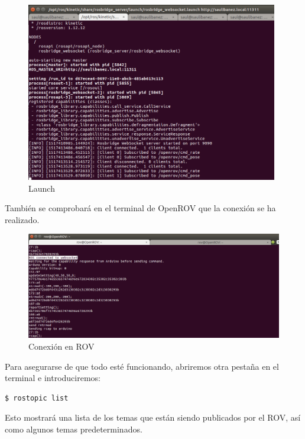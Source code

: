 \begin{figure} [hbtp]
  \begin{center}
    \includegraphics[width=11cm]{img/cap4/launch}
  \end{center}
  \caption{Launch}
  \label{fig:websocket.launch}
\end{figure}

También se comprobará en el terminal de OpenROV que la conexión se ha realizado.

\begin{figure} [hbtp]
  \begin{center}
    \includegraphics[width=14cm]{img/cap4/conexion_ROV}
  \end{center}
  \caption{Conexión en ROV}
  \label{fig:conect_rov}
\end{figure}

Para asegurarse de que todo esté funcionando, abriremos otra pestaña en el terminal e introduciremos:
\begin{lstlisting}[caption=rostopic list, label={lst:list}]
	$ rostopic list
\end{lstlisting}

Esto mostrará una lista de los temas que están siendo publicados por el ROV, así como algunos temas predeterminados.

